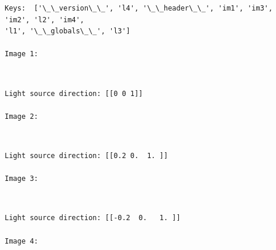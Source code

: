 \documentclass[11pt]{article}
\begin{document}
    \begin{Verbatim}[commandchars=\\\{\}]
Keys:  ['\_\_version\_\_', 'l4', '\_\_header\_\_', 'im1', 'im3', 'im2', 'l2', 'im4',
'l1', '\_\_globals\_\_', 'l3']

Image 1:
    \end{Verbatim}

    \begin{center}
    \end{center}
    { \hspace*{\fill} \\}
    
    \begin{Verbatim}[commandchars=\\\{\}]
Light source direction: [[0 0 1]]

Image 2:
    \end{Verbatim}

    \begin{center}
    \end{center}
    { \hspace*{\fill} \\}
    
    \begin{Verbatim}[commandchars=\\\{\}]
Light source direction: [[0.2 0.  1. ]]

Image 3:
    \end{Verbatim}

    \begin{center}
    \end{center}
    { \hspace*{\fill} \\}
    
    \begin{Verbatim}[commandchars=\\\{\}]
Light source direction: [[-0.2  0.   1. ]]

Image 4:
    \end{Verbatim}

    \begin{center}
    \end{center}
    { \hspace*{\fill} \\}
    
\end{document}
